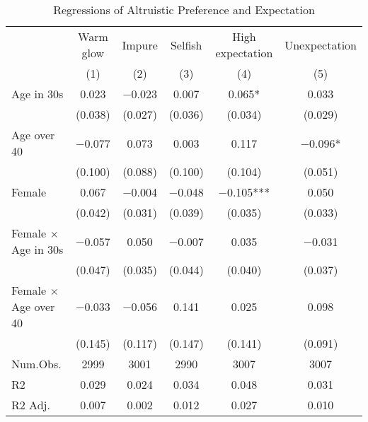 \documentclass[
]{article}
\begin{document}
\begin{table}

\caption{\label{tab:altruistic-pref}Regressions of Altruistic Preference and Expectation}
\centering
\fontsize{9}{11}\selectfont
\begin{tabular}[t]{lccccc}
\toprule
\multicolumn{1}{c}{ } & \multicolumn{1}{c}{Warm glow} & \multicolumn{1}{c}{Impure} & \multicolumn{1}{c}{Selfish} & \multicolumn{1}{c}{High expectation} & \multicolumn{1}{c}{Unexpectation} \\
\cmidrule(l{3pt}r{3pt}){2-2} \cmidrule(l{3pt}r{3pt}){3-3} \cmidrule(l{3pt}r{3pt}){4-4} \cmidrule(l{3pt}r{3pt}){5-5} \cmidrule(l{3pt}r{3pt}){6-6}
  & (1) & (2) & (3) & (4) & (5)\\
\midrule
Age in 30s & \num{0.023} & \num{-0.023} & \num{0.007} & \num{0.065}* & \num{0.033}\\
 & (\num{0.038}) & (\num{0.027}) & (\num{0.036}) & (\num{0.034}) & (\num{0.029})\\
Age over 40 & \num{-0.077} & \num{0.073} & \num{0.003} & \num{0.117} & \num{-0.096}*\\
 & (\num{0.100}) & (\num{0.088}) & (\num{0.100}) & (\num{0.104}) & (\num{0.051})\\
Female & \num{0.067} & \num{-0.004} & \num{-0.048} & \num{-0.105}*** & \num{0.050}\\
 & (\num{0.042}) & (\num{0.031}) & (\num{0.039}) & (\num{0.035}) & (\num{0.033})\\
Female $\times$ Age in 30s & \num{-0.057} & \num{0.050} & \num{-0.007} & \num{0.035} & \num{-0.031}\\
 & (\num{0.047}) & (\num{0.035}) & (\num{0.044}) & (\num{0.040}) & (\num{0.037})\\
Female $\times$ Age over 40 & \num{-0.033} & \num{-0.056} & \num{0.141} & \num{0.025} & \num{0.098}\\
 & (\num{0.145}) & (\num{0.117}) & (\num{0.147}) & (\num{0.141}) & (\num{0.091})\\
\midrule
Num.Obs. & \num{2999} & \num{3001} & \num{2990} & \num{3007} & \num{3007}\\
R2 & \num{0.029} & \num{0.024} & \num{0.034} & \num{0.048} & \num{0.031}\\
R2 Adj. & \num{0.007} & \num{0.002} & \num{0.012} & \num{0.027} & \num{0.010}\\
\bottomrule
\end{tabular}
\end{table}

  
\end{document}
